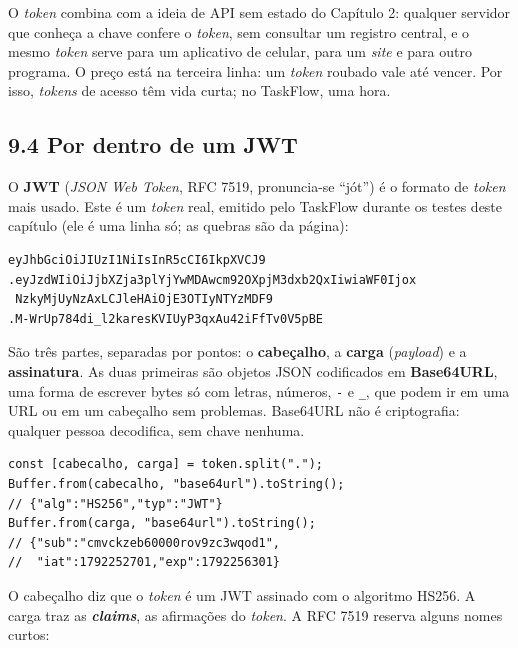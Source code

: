 O \textit{token} combina com a ideia de API sem estado do Capítulo 2: qualquer servidor que conheça a chave confere o \textit{token}, sem consultar um registro central, e o mesmo \textit{token} serve para um aplicativo de celular, para um \textit{site} e para outro programa. O preço está na terceira linha: um \textit{token} roubado vale até vencer. Por isso, \textit{tokens} de acesso têm vida curta; no TaskFlow, uma hora.

\subsection{9.4 Por dentro de um JWT}

O \textbf{JWT} (\textit{JSON Web Token}, RFC 7519, pronuncia-se ``jót'') é o formato de \textit{token} mais usado. Este é um \textit{token} real, emitido pelo TaskFlow durante os testes deste capítulo (ele é uma linha só; as quebras são da página):

\begin{codigo}
\begin{Verbatim}[breaklines=true, breaksymbolleft={}, fontsize=\footnotesize]
eyJhbGciOiJIUzI1NiIsInR5cCI6IkpXVCJ9
.eyJzdWIiOiJjbXZja3plYjYwMDAwcm92OXpjM3dxb2QxIiwiaWF0Ijox
 NzkyMjUyNzAxLCJleHAiOjE3OTIyNTYzMDF9
.M-WrUp784di_l2karesKVIUyP3qxAu42iFfTv0V5pBE
\end{Verbatim}
\end{codigo}

São três partes, separadas por pontos: o \textbf{cabeçalho}, a \textbf{carga} (\textit{payload}) e a \textbf{assinatura}. As duas primeiras são objetos JSON codificados em \textbf{Base64URL}, uma forma de escrever bytes só com letras, números, \texttt{-} e \texttt{\_}, que podem ir em uma URL ou em um cabeçalho sem problemas. Base64URL não é criptografia: qualquer pessoa decodifica, sem chave nenhuma.

\begin{codigo}
\begin{Verbatim}[breaklines=true, breaksymbolleft={}, fontsize=\footnotesize]
const [cabecalho, carga] = token.split(".");
Buffer.from(cabecalho, "base64url").toString();
// {"alg":"HS256","typ":"JWT"}
Buffer.from(carga, "base64url").toString();
// {"sub":"cmvckzeb60000rov9zc3wqod1",
//  "iat":1792252701,"exp":1792256301}
\end{Verbatim}
\end{codigo}

O cabeçalho diz que o \textit{token} é um JWT assinado com o algoritmo HS256. A carga traz as \textbf{\textit{claims}}, as afirmações do \textit{token}. A RFC 7519 reserva alguns nomes curtos:

